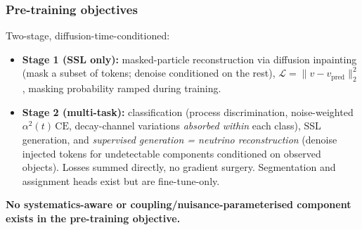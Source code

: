 \documentclass[11pt]{article}
\begin{document}
\subsubsection{Pre-training objectives}
Two-stage, diffusion-time-conditioned:
\begin{itemize}
\item \textbf{Stage 1 (SSL only):} masked-particle reconstruction via
  diffusion inpainting (mask a subset of tokens; denoise conditioned on the
  rest), $\mathcal{L}=\lVert v - v_{\mathrm{pred}}\rVert_2^2$, masking
  probability ramped during training.
\item \textbf{Stage 2 (multi-task):} classification (process discrimination,
  noise-weighted $\alpha^2(t)\,\mathrm{CE}$, decay-channel variations
  \emph{absorbed within} each class), SSL generation, and \emph{supervised
  generation = neutrino reconstruction} (denoise injected tokens for
  undetectable components conditioned on observed objects). Losses summed
  directly, no gradient surgery. Segmentation and assignment heads exist but
  are fine-tune-only.
\end{itemize}
\textbf{No systematics-aware or coupling/nuisance-parameterised component
exists in the pre-training objective.}
\end{document}
